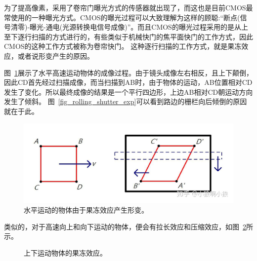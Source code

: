 \documentclass{ctexart}
\begin{document}
为了提高像素，采用了卷帘门曝光方式的传感器就出现了，而这也是目前CMOS最常使用的一种曝光方式。CMOS的曝光过程可以大致理解为这样的顾聪:“断点(信号清零)-曝光-通电(光源转换电信号成像)”。而且CMOS的曝光过程采用的是从上至下逐行扫描的方式进行的，有些类似于机械快门的焦平面快门的工作方式，因此CMOS的这种工作方式被称为卷帘快门。
这种逐行扫描的工作方式，就是果冻效应，或者说形变产生的原因。

图~\ref{fig_rolling_shutter_right}展示了水平高速运动物体的成像过程。由于镜头成像左右相反，且上下颠倒，因此CD首先经过扫描成像，而当扫描到AB时，由于物体的运动，AB位置相对CD发生了变化。所以最终成像的结果是一个平行四边形，上边AB相对CD朝运动方向发生了倾斜。
图~\ref{fig_rolling_shutter_exp}可以看到路边的栅栏向后倾倒的原因就在于此。
\begin{figure}[h]
    \centering
    \includegraphics[width=.75\textwidth]{imgs/rolling_shutter_right.jpg}
    \caption{水平运动的物体由于果冻效应产生形变。}
    \label{fig_rolling_shutter_right}
\end{figure}
类似的，对于高速向上和向下运动的物体，便会有拉长效应和压缩效应，如图~\ref{fig_rolling_shutter_up_down}所示。
\begin{figure}[h]
    \centering
    \caption{上下运动物体的果冻效应。}
    \label{fig_rolling_shutter_up_down}
\end{figure}
\end{document}
